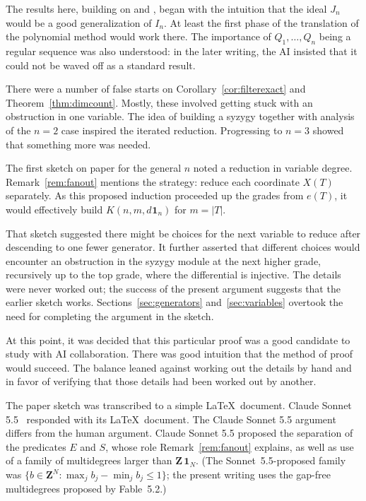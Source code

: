 \documentclass[12pt]{amsart}
\theoremstyle{definition}
\theoremstyle{remark}
\newcommand{\Z}{\mathbf Z}
\newcommand{\One}{\mathbf{1}}
\newcommand{\dOne}[1]{d\mspace{1mu}\One_{#1}}
\newcommand\KSV{monthly-kutin-smithline-vatter}
\begin{document}
The results here, building on \cite{\KSV} and \cite{arxiv-kutin-smithline},
began with the intuition that the ideal $J_n$ would be a good generalization of
$I_n$.  At least the first phase of the translation of the polynomial method
would work there.  The importance of $Q_1, \ldots, Q_n$ being
a regular sequence was also understood: in the later writing, the AI insisted that
it could not be waved off as a standard result.

There were a number of false starts on Corollary~\ref{cor:filterexact} and Theorem~\ref{thm:dimcount}.  Mostly, these involved getting stuck with
an obstruction in one variable.  The idea of building a syzygy together
with analysis of the $n=2$ case inspired the iterated reduction.
Progressing to $n=3$ showed that something more was needed.

The first sketch on paper for the general $n$ noted a reduction in variable degree.
Remark~\ref{rem:fanout} mentions the strategy: reduce each coordinate $X(T)$
separately.  
As this proposed induction proceeded up the grades from $e(T)$, it would
effectively build $K(n, m, \dOne{n})$ for $m = |T|$.

That sketch suggested there might be choices for the next variable to reduce
after descending to one fewer generator.
It further asserted that 
different choices would encounter an obstruction 
in the syzygy module at the next higher grade,
recursively up to the top grade, where the differential is injective.
The details were never worked out; the success of the present argument
suggests that the earlier sketch works.  
Sections~\ref{sec:generators} and~\ref{sec:variables} overtook
the need for completing the argument in the sketch.


At this point, it was decided that this particular proof was a good candidate to
study with AI collaboration.  There was good intuition that the method of proof would
succeed.  The balance leaned against working out the
details by hand and in favor of verifying that
those details had been worked out by another.

The paper sketch was transcribed to a simple \LaTeX\ document.
Claude Sonnet 5.5~\cite{claude-sonnet-2026-koszul} responded with its
\LaTeX\ document.  The Claude Sonnet 5.5 argument differs from the human
argument.  Claude Sonnet 5.5 proposed
the separation of the predicates $E$ and $S$, whose role
Remark~\ref{rem:fanout} explains, as well as use of
a family of multidegrees larger than $\Z\, \One_N$.
(The Sonnet~5.5-proposed family was $\{ b\in \Z^N : \max_j b_j - \min_j b_j \leq 1 \}$;
the present writing uses the gap-free multidegrees proposed by Fable~5.2.)
\end{document}
